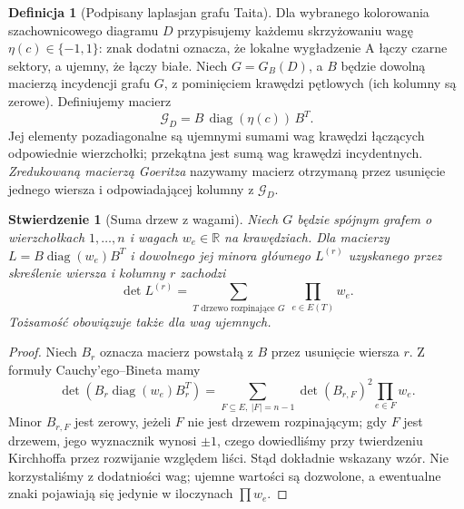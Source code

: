 \documentclass[11pt,a4paper]{report}
\numberwithin{equation}{section}
\theoremstyle{plain}
\newtheorem{stwierdzenie}[twierdzenie]{Stwierdzenie}
\theoremstyle{definition}
\newtheorem{definicja}[twierdzenie]{Definicja}
\theoremstyle{remark}
\begin{document}
\begin{definicja}[Podpisany laplasjan grafu Taita]
Dla wybranego kolorowania szachownicowego diagramu $D$
przypisujemy każdemu skrzyżowaniu wagę
$\eta(c)\in\{-1,1\}$: znak dodatni oznacza,
że lokalne wygładzenie A łączy czarne sektory,
a ujemny, że łączy białe. Niech $G=G_B(D)$, a
$B$ będzie dowolną macierzą incydencji grafu $G$,
z pominięciem krawędzi pętlowych (ich kolumny są zerowe).
Definiujemy macierz
\[
\mathcal G_D=B\,\operatorname{diag}(\eta(c))\,B^T.
\]
Jej elementy pozadiagonalne są ujemnymi sumami wag
krawędzi łączących odpowiednie wierzchołki; przekątna
jest sumą wag krawędzi incydentnych. \emph{Zredukowaną
macierzą Goeritza} nazywamy macierz otrzymaną przez
usunięcie jednego wiersza i odpowiadającej kolumny
z $\mathcal G_D$.
\end{definicja}

\begin{stwierdzenie}[Suma drzew z wagami]
Niech $G$ będzie spójnym grafem o wierzchołkach
$1,\ldots,n$ i wagach $w_e\in\mathbb R$ na krawędziach.
Dla macierzy $L=B\operatorname{diag}(w_e)B^T$
i dowolnego jej minora głównego $L^{(r)}$
uzyskanego przez skreślenie wiersza i kolumny $r$
zachodzi
\[
\det L^{(r)}=\sum_{T\text{ drzewo rozpinające }G}
\ \prod_{e\in E(T)}w_e.
\]
Tożsamość obowiązuje także dla wag ujemnych.
\end{stwierdzenie}
\begin{proof}
Niech $B_r$ oznacza macierz powstałą z $B$ przez
usunięcie wiersza $r$. Z formuły Cauchy'ego--Bineta
mamy
\[
\det(B_r\operatorname{diag}(w_e)B_r^T)
=\sum_{F\subseteq E,\ |F|=n-1}
\det(B_{r,F})^2\prod_{e\in F}w_e.
\]
Minor $B_{r,F}$ jest zerowy, jeżeli $F$ nie jest
drzewem rozpinającym; gdy $F$ jest drzewem,
jego wyznacznik wynosi $\pm1$, czego dowiedliśmy
przy twierdzeniu Kirchhoffa przez rozwijanie
względem liści. Stąd dokładnie wskazany wzór.
Nie korzystaliśmy z dodatniości wag; ujemne wartości
są dozwolone, a ewentualne znaki pojawiają się jedynie
w iloczynach $\prod w_e$.
\end{proof}
\end{document}
